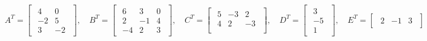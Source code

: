 \documentclass{article}
\begin{document}
\begin{equation*}
    A^T = \begin{bmatrix}
        \begin{array}{rrr}
            4 & 0 \\ 
            -2 & 5 \\
            3 & -2
        \end{array}
    \end{bmatrix}
    , \quad B^T = \begin{bmatrix}
        \begin{array}{rrr}
            6 & 3 & 0\\ 
            2 & -1 & 4\\
            -4 & 2 & 3
        \end{array}
    \end{bmatrix}
    , \quad C^T = \begin{bmatrix}
        \begin{array}{rrr}
            5 & -3 & 2\\ 
            4 & 2 & -3\\
        \end{array}
    \end{bmatrix}
    , \quad D^T = \begin{bmatrix}
        \begin{array}{r}
            3 \\
            -5\\ 
            1
        \end{array}
    \end{bmatrix}
    , \quad E^T = \begin{bmatrix}
        \begin{array}{rrr}
            2 & -1 & 3
        \end{array}
    \end{bmatrix}
\end{equation*}
\end{document}
